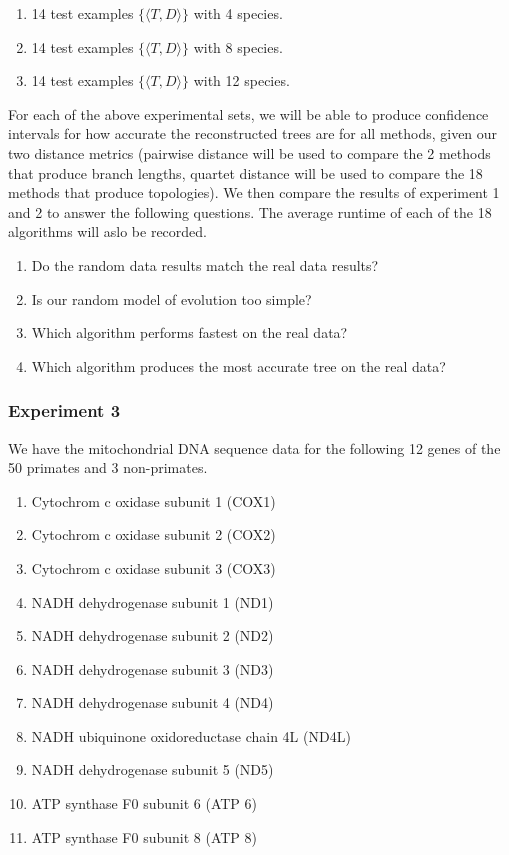 \documentclass[10pt,twocolumn]{article}
\begin{document}
\begin{enumerate}
  \item 14 test examples $\{\langle T, D \rangle\}$ with 4 species.
  \item 14 test examples $\{\langle T, D \rangle\}$ with 8 species.
  \item 14 test examples $\{\langle T, D \rangle\}$ with 12 species.
\end{enumerate}

For each of the above experimental sets, we will be able to produce confidence intervals for how
accurate the reconstructed trees are for all methods, given our two distance metrics
(pairwise distance will be used to compare the 2 methods that produce branch lengths,
quartet distance will be used to compare the 18 methods that produce topologies). We 
then compare the results of experiment 1 and 2 to answer the following questions. The average 
runtime of each of the 18 algorithms will aslo be recorded.

\begin{enumerate}
  \item Do the random data results match the real data results?
  \item Is our random model of evolution too simple? 
  \item Which algorithm performs fastest on the real data?
  \item Which algorithm produces the most accurate tree on the real data?
\end{enumerate}

\subsubsection*{Experiment 3}
We have the mitochondrial DNA sequence data for the following 12 genes of the 50 primates and 3 non-primates.
\begin{enumerate}
  \item Cytochrom c oxidase subunit 1 (COX1)
  \item Cytochrom c oxidase subunit 2 (COX2)
  \item Cytochrom c oxidase subunit 3 (COX3)
  \item NADH dehydrogenase subunit 1 (ND1) 
  \item NADH dehydrogenase subunit 2 (ND2) 
  \item NADH dehydrogenase subunit 3 (ND3) 
  \item NADH dehydrogenase subunit 4 (ND4)
  \item NADH ubiquinone oxidoreductase chain 4L (ND4L) 
  \item NADH dehydrogenase subunit 5 (ND5)
  \item ATP synthase F0 subunit 6 (ATP 6)
  \item ATP synthase F0 subunit 8 (ATP 8)
\end{enumerate}
\end{document}
